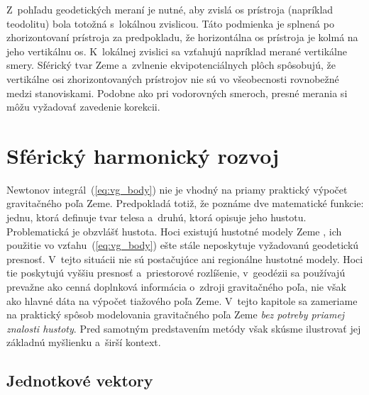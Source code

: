 \documentclass[a4paper, 12pt]{book}
\begin{document}
Z~pohľadu geodetických meraní je nutné, aby zvislá os prístroja (napríklad
teodolitu) bola totožná s~lokálnou zvislicou.  Táto podmienka je splnená po
zhorizontovaní prístroja za predpokladu, že horizontálna os prístroja je kolmá
na jeho vertikálnu os.  K~lokálnej zvislici sa vzťahujú napríklad merané
vertikálne smery.  Sférický tvar Zeme a~zvlnenie ekvipotenciálnych plôch
spôsobujú, že vertikálne osi zhorizontovaných prístrojov nie sú vo všeobecnosti
rovnobežné medzi stanoviskami.  Podobne ako pri vodorovných smeroch, presné
merania si môžu vyžadovať zavedenie korekcii.







\chapter{Sférický harmonický rozvoj}
\label{sec:spherical_harmonic_expansion}

Newtonov integrál~(\ref{eq:vg_body}) nie je vhodný na priamy praktický výpočet
gravitačného poľa Zeme.  Predpokladá totiž, že poznáme dve matematické funkcie:
jednu, ktorá definuje tvar telesa a~druhú, ktorá opisuje jeho hustotu.
Problematická je obzvlášť hustota.  Hoci existujú hustotné modely Zeme
\citep[napríklad][]{Dziewonski1981}, ich použitie vo vzťahu~(\ref{eq:vg_body})
ešte stále neposkytuje vyžadovanú geodetickú presnosť.  V~tejto situácii nie sú
postačujúce ani regionálne hustotné modely.  Hoci tie poskytujú vyššiu presnosť
a~priestorové rozlíšenie, v~geodézii sa používajú prevažne ako cenná doplnková
informácia o~zdroji gravitačného poľa, nie však ako hlavné dáta na výpočet
tiažového poľa Zeme.  V~tejto kapitole sa zameriame na praktický spôsob
modelovania gravitačného poľa Zeme \emph{bez potreby priamej znalosti hustoty}.
Pred samotným predstavením metódy však skúsme ilustrovať jej základnú myšlienku
a~širší kontext.






\section{Jednotkové vektory}
\label{sec:unit_vectors}
\end{document}
